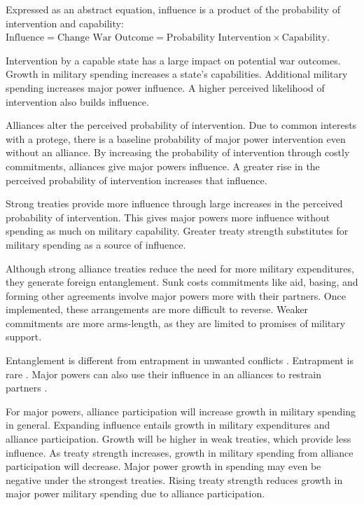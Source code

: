 \documentclass[12pt]{article}
\begin{document}
Expressed as an abstract equation, influence is a product of the probability of intervention and capability: $\mbox{Influence} = \mbox{Change War Outcome} = \mbox{Probability Intervention} \times \mbox{Capability}$.


Intervention by a capable state has a large impact on potential war outcomes.
Growth in military spending increases a state's capabilities.
Additional military spending increases major power influence.   
A higher perceived likelihood of intervention also builds influence.


Alliances alter the perceived probability of intervention. 
Due to common interests with a protege, there is a baseline probability of major power intervention even without an alliance. 
By increasing the probability of intervention through costly commitments, alliances give major powers influence. 
A greater rise in the perceived probability of intervention increases that influence.


Strong treaties provide more influence through large increases in the perceived probability of intervention. 
This gives major powers more influence without spending as much on military capability. 
Greater treaty strength substitutes for military spending as a source of influence.  


Although strong alliance treaties reduce the need for more military expenditures, they generate foreign entanglement.
Sunk costs commitments like aid, basing, and forming other agreements involve major powers more with their partners. 
Once implemented, these arrangements are more difficult to reverse. 
Weaker commitments are more arms-length, as they are limited to promises of military support. 


Entanglement is different from entrapment in unwanted conflicts \citep{Snyder1997}.
Entrapment is rare \citep{Beckley2015}. 
Major powers can also use their influence in an alliances to restrain partners \citep{Lake1996, Fangetal2014}.  


For major powers, alliance participation will increase growth in military spending in general. 
Expanding influence entails growth in military expenditures and alliance participation. 
Growth will be higher in weak treaties, which provide less influence. 
As treaty strength increases, growth in military spending from alliance participation will decrease. 
Major power growth in spending may even be negative under the strongest treaties. 
Rising treaty strength reduces growth in major power military spending due to alliance participation. 
\end{document}
